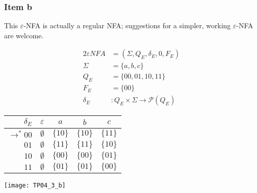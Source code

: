 {\subsubsection{Item b}
This $\varepsilon$-NFA is actually a regular NFA; suggestions for a simpler, working $\varepsilon$-NFA are welcome.
\begin{center}
	\begin{minipage}[c]{0.27\textwidth}
		\begin{alignat*}{2}
			\varepsilon NFA &= (\Sigma, Q_E, \delta_E, 0, F_E)\\
			\Sigma &= \{a,b,c\}\\
			Q_E    &= \{00,01,10,11\}\\
			F_E    &= \{00\}\\
			\delta_E &\colon Q_E \times \Sigma \rightarrow \mathscr{P}(Q_E)
		\end{alignat*}
	\end{minipage}
	\begin{minipage}[c]{0.35\textwidth}
		\begin{center}
		\begin{tabular}{ r | c c c c }
 			$\delta_E           $ & $\varepsilon$ & $a    $ & $b    $ & $c$ \\ \hline
 			$\rightarrow^* 00$ & $\emptyset  $ & $\{10\}$ & $\{10\}$ & $\{11\}$ \\  
 			$                 01$ & $\emptyset  $ & $\{11\}$ & $\{11\}$ & $\{10\}$ \\
 			$                 10$ & $\emptyset  $ & $\{00\}$ & $\{00\}$ & $\{01\}$\\
 			$                 11$ & $\emptyset  $ & $\{01\}$ & $\{01\}$ & $\{00\}$
		\end{tabular}
		\end{center}
	\end{minipage}
	\begin{minipage}[c]{0.37\textwidth}
		\begin{center} \texttt{[image: TP04\_3\_b]} \end{center}
	\end{minipage}
\end{center}
}
